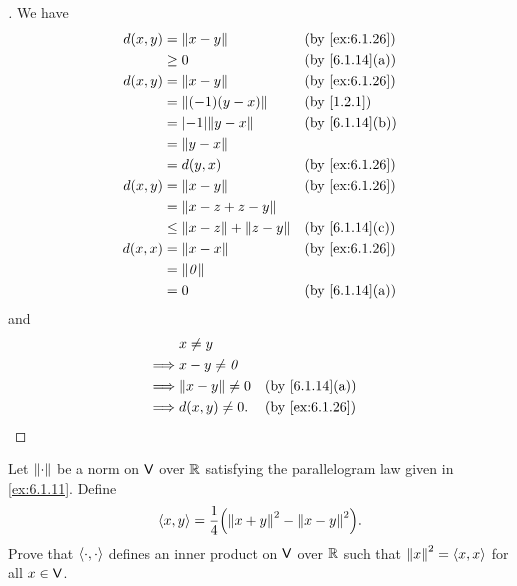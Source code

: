 \begin{proof}[]
	We have
	\begin{align*}
		d(x, y) & = \norm{x - y}                   &  & \by{ex:6.1.26} \\
		        & \geq 0                           &  & \by{6.1.14}[a] \\
		d(x, y) & = \norm{x - y}                   &  & \by{ex:6.1.26} \\
		        & = \norm{(-1)(y - x)}             &  & \by{1.2.1}     \\
		        & = \abs{-1} \norm{y - x}          &  & \by{6.1.14}[b] \\
		        & = \norm{y - x}                                       \\
		        & = d(y, x)                        &  & \by{ex:6.1.26} \\
		d(x, y) & = \norm{x - y}                   &  & \by{ex:6.1.26} \\
		        & = \norm{x - z + z - y}                               \\
		        & \leq \norm{x - z} + \norm{z - y} &  & \by{6.1.14}[c] \\
		d(x, x) & = \norm{x - x}                   &  & \by{ex:6.1.26} \\
		        & = \norm{\zv}                                         \\
		        & = 0                              &  & \by{6.1.14}[a]
	\end{align*}
	and
	\begin{align*}
		         & x \neq y                                \\
		\implies & x - y \neq \zv                          \\
		\implies & \norm{x - y} \neq 0 &  & \by{6.1.14}[a] \\
		\implies & d(x, y) \neq 0.     &  & \by{ex:6.1.26}
	\end{align*}
\end{proof}

\begin{ex}\label{ex:6.1.27}
	Let \(\left\lVert\cdot\right\rVert\) be a norm on \(\mathsf{V}\) over \(\mathbb{R}\) satisfying the parallelogram law given in \cref{ex:6.1.11}.
	Define
	\[
		\inn{x, y} = \frac{1}{4} \pa{\norm{x + y}^2 - \norm{x - y}^2}.
	\]
	Prove that \(\left\langle\cdot, \cdot\right\rangle\) defines an inner product on \(\mathsf{V}\) over \(\mathbb{R}\) such that \(\left\lVert x\right\rVert^2 = \left\langle x, x\right\rangle\) for all \(x \in \mathsf{V}\).
\end{ex}

